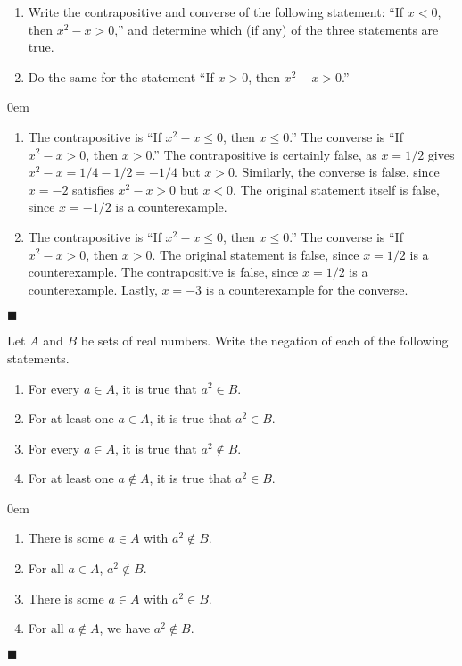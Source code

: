\documentclass[12pt]{article}
\renewcommand{\qed}{\hfill$\blacksquare$}
\renewenvironment{proof}{\begin{addmargin}[1em]{0em}\begin{newproof}}{\end{newproof}\end{addmargin}\qed}
\newenvironment{problem}[2][Exercise]{\begin{trivlist}
\item[\hskip \labelsep {\bfseries #1}\hskip \labelsep {\bfseries #2.}]}{\end{trivlist}}
\begin{document}
\begin{problem}{1.1.3}
\begin{enumerate}[label=(\alph*)] 
	\item Write the contrapositive and converse of the following statement: ``If $x<0$, then $x^2 -x >0$,'' and determine which (if any) of the three statements are true.
	\item Do the same for the statement ``If $x>0$, then $x^2-x>0$.''
\end{enumerate}
\end{problem}
\begin{proof}
\begin{enumerate}[label=(\alph*)]
	\item The contrapositive is ``If $x^2-x\leq 0$, then $x \leq 0$.'' The converse is ``If $x^2-x>0$, then $x>0$.'' The contrapositive is certainly false, as $x=1/2$ gives $x^2-x = 1/4-1/2 = -1/4$ but $x > 0$. Similarly, the converse is false, since $x = -2$ satisfies $x^2-x>0$ but $x<0$. The original statement itself is false, since $x=-1/2$ is a counterexample.
	\item The contrapositive is ``If $x^2-x \leq 0$, then $x \leq 0$.'' The converse is ``If $x^2-x >0$, then $x>0$. The original statement is false, since $x=1/2$ is a counterexample. The contrapositive is false, since $x=1/2$ is a counterexample. Lastly, $x=-3$ is a counterexample for the converse.
\end{enumerate}
\end{proof}

\begin{problem}{1.1.4}
Let $A$ and $B$ be sets of real numbers. Write the negation of each of the following statements.
\begin{enumerate}[label=(\alph*)]
	\item For every $a\in A$, it is true that $a^2 \in B$.
	\item For at least one $a\in A$, it is true that $a^2 \in B$.
	\item For every $a\in A$, it is true that $a^2 \notin B$.
	\item For at least one $a\notin A$, it is true that $a^2 \in B$.
\end{enumerate}
\end{problem}
\begin{proof}
\begin{enumerate}[label=(\alph*)]
	\item There is some $a\in A$ with $a^2 \notin B$.
	\item For all $a\in A$, $a^2 \notin B$.
	\item There is some $a\in A$ with $a^2 \in B$.
	\item For all $a\notin A$, we have $a^2 \notin B$.
\end{enumerate}
\end{proof}
\end{document}
